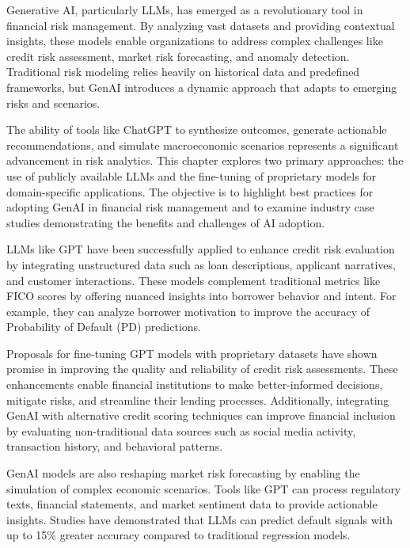 \documentclass[a4paper,headinclude=on,footinclude=on,12pt,oneside]{scrbook}
\begin{document}
	
	Generative AI, particularly LLMs, has emerged as a revolutionary tool in financial risk management. By analyzing vast datasets and providing contextual insights, these models enable organizations to address complex challenges like credit risk assessment, market risk forecasting, and anomaly detection. Traditional risk modeling relies heavily on historical data and predefined frameworks, but GenAI introduces a dynamic approach that adapts to emerging risks and scenarios.
	
	The ability of tools like ChatGPT to synthesize outcomes, generate actionable recommendations, and simulate macroeconomic scenarios represents a significant advancement in risk analytics. This chapter explores two primary approaches: the use of publicly available LLMs and the fine-tuning of proprietary models for domain-specific applications. The objective is to highlight best practices for adopting GenAI in financial risk management and to examine industry case studies demonstrating the benefits and challenges of AI adoption.
	
	
	
	LLMs like GPT have been successfully applied to enhance credit risk evaluation by integrating unstructured data such as loan descriptions, applicant narratives, and customer interactions. These models complement traditional metrics like FICO scores by offering nuanced insights into borrower behavior and intent. For example, they can analyze borrower motivation to improve the accuracy of Probability of Default (PD) predictions.
	
	Proposals for fine-tuning GPT models with proprietary datasets have shown promise in improving the quality and reliability of credit risk assessments. These enhancements enable financial institutions to make better-informed decisions, mitigate risks, and streamline their lending processes. Additionally, integrating GenAI with alternative credit scoring techniques can improve financial inclusion by evaluating non-traditional data sources such as social media activity, transaction history, and behavioral patterns.
	
	
	GenAI models are also reshaping market risk forecasting by enabling the simulation of complex economic scenarios. Tools like GPT can process regulatory texts, financial statements, and market sentiment data to provide actionable insights. Studies have demonstrated that LLMs can predict default signals with up to 15\% greater accuracy compared to traditional regression models.
	
\end{document}
